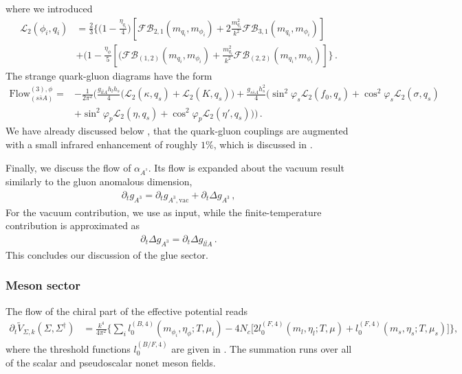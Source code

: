 \documentclass[reprint,twocolumn,superscriptaddress,preprintnumbers,amsmath,amssymb,aps,prd,floatfix]{revtex4-2}
\begin{document}
%
where we introduced 
%
\begin{align}\nonumber
	\mathcal{L}_2(\phi_i,q_i)&=\frac{2}{3}\Biggl\{\bigg(1-\frac{\eta_{q_i}}{4}\bigg)\left[\mathcal{FB}_{2,1}(m_{q_i},m_{\phi_i})+2\frac{m_{q_i}^2}{k^2}\mathcal{FB}_{3,1}(m_{q_i},m_{\phi_i})\right] \\[1ex] 
	&+\bigg(1-\frac{\eta_\phi}{5}\left[\bigg(\mathcal{FB}_{(1,2)}(m_{q_i},m_{\phi_i})+\frac{m_{q_i}^2}{k^2}\mathcal{FB}_{(2,2)}(m_{q_i},m_{\phi_i})\right]\Biggr\}\,.
\end{align}
%
The strange quark-gluon diagrams have the form 
%
\begin{align}
	{\textrm{Flow}}^{(3),\phi}_{{({s \bar{s}A })}}
	=& -\frac{1}{2\pi^2}\bigg(\frac{g_{l \bar{l}A } {h}_{l}{h}_{s}}{4}\bigg(\mathcal{L}_2(\kappa,q_s)+\mathcal{L}_2(K,q_s)\bigg)
	+  \frac{g_{s \bar{s}A } {h}_{s}^2}{4}(\sin^2 \varphi_s \mathcal{L}_2(f_0,q_s)+\cos^2 \varphi_s\mathcal{L}_2(\sigma,q_s)
	\nonumber \\[1ex]  
	&+\sin^2 \varphi_p\mathcal{L}_2(\eta,q_s)+\cos^2 \varphi_p  \mathcal{L}_2(\eta ',q_s)
	\bigg)\bigg)\,.
\end{align}
%
We have already discussed below , that the quark-gluon couplings are augmented with a small infrared enhancement of roughly $1\%$, which is discussed in .  

Finally, we discuss the flow of $\alpha_{A^^3}$. Its flow is expanded about the vacuum result similarly to the gluon anomalous dimension, 
%
\begin{align}
	\partial_t g_{A^3}=\partial_t g_{A^3, \textrm{vac}}+\partial_t \Delta g_{A^3}\,,
\end{align}
%
For the vacuum contribution, we use \cite{Braun:2014ata} as input, while the finite-temperature contribution is approximated as
%
\begin{align}
	\partial_t \Delta g_{A^3} = \partial_t \Delta g_{l \bar l A}\,.
\end{align}
%
This concludes our discussion of the glue sector. 


\subsubsection{Meson sector}
\label{app:MesonSector}

The flow of the chiral part of the effective potential reads
%
\begin{align}\label{eq:flowU}
\partial_t \tilde{V}_{\Sigma,k} (\Sigma,\Sigma^\dagger)&= \frac{k^4}{4 \pi^2}\bigg\{ \sum_i l_0^{(B,4)}(m_{\phi_i},\eta_{\phi};T,\mu_i)
-4 N_c\big[ 2 l_0^{(F,4)}(m_{l},\eta_l;T,\mu)
 + l_0^{(F,4)}(m_{s},\eta_s;T,\mu_s)\big]\bigg\},
\end{align}
%
where the threshold functions $l_0^{(B/F,4)}$ are given in \cite{Fu:2019hdw}. The summation runs over all of the scalar and pseudoscalar nonet meson fields.
\end{document}
